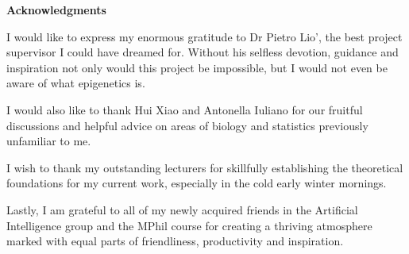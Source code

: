\newpage
{\Huge \bf Acknowledgments}
\vspace{24pt} 

I would like to express my enormous gratitude to Dr Pietro Lio', the best project supervisor I could have dreamed for. Without his selfless devotion, guidance and inspiration not only would this project be impossible, but I would not even be aware of what epigenetics is. 

I would also like to thank Hui Xiao and Antonella Iuliano for our fruitful discussions and helpful advice on areas of biology and statistics previously unfamiliar to me. 

I wish to thank my outstanding lecturers for skillfully establishing the theoretical foundations for my current work, especially in the cold early winter mornings. 

Lastly, I am grateful to all of my newly acquired friends in the Artificial Intelligence group and the MPhil course for creating a thriving atmosphere marked with equal parts of friendliness, productivity and inspiration.

\newpage
\vspace*{\fill}